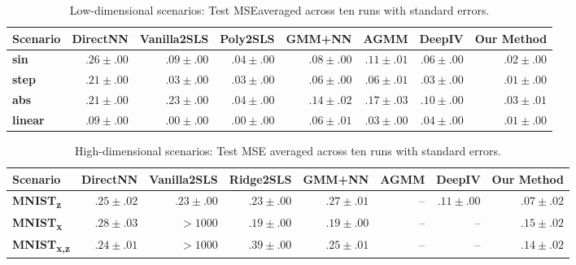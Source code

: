 \documentclass{article}
\theoremstyle{plain}
\theoremstyle{definition}
\newcommand\mnist[1]{\textbf{MNIST\textsubscript{#1}}}
\begin{document}
  {
\begin{table}[t!]
\setlength{\tabcolsep}{3pt}
\centering
\begin{tabular}{lrrrrrrr}
\toprule
  {Scenario} &       {DirectNN} &    {Vanilla2SLS} &       {Poly2SLS} &         {GMM+NN} &           {AGMM} &         {DeepIV} &     {Our Method} \\
\midrule
    \textbf{sin} &  $.26 \pm .00$ &  $.09 \pm .00$ &  $.04 \pm .00$ &  $.08 \pm .00$ &  $.11 \pm .01$ &  $.06 \pm .00$ &  $.02 \pm .00$ \\
  \textbf{step} &  $.21 \pm .00$ &  $.03 \pm .00$ &  $.03 \pm .00$ &  $.06 \pm .00$ &  $.06 \pm .01$ &  $.03 \pm .00$ &  $.01 \pm .00$ \\
   \textbf{abs} &  $.21 \pm .00$ &  $.23 \pm .00$ &  $.04 \pm .00$ &  $.14 \pm .02$ &  $.17 \pm .03$ &  $.10 \pm .00$ &  $.03 \pm .01$ \\
 \textbf{linear} &  $.09 \pm .00$ &  $.00 \pm .00$ &  $.00 \pm .00$ &  $.06 \pm .01$ &  $.03 \pm .00$ &  $.04 \pm .00$ &  $.01 \pm .00$ \\
\bottomrule
\end{tabular}
%
\caption{Low-dimensional scenarios: Test MSE\label{tab:lowdimex} averaged across ten runs with standard errors.}
%
\end{table}
%
%
%
%
\begin{table}[t!]
\setlength{\tabcolsep}{3pt}
\centering
\begin{tabular}{lrrrrrrr}
\toprule
       Scenario &         DirectNN &                                Vanilla2SLS &        Ridge2SLS &           GMM+NN & AGMM & DeepIV &       Our Method \\
\midrule
   \mnist{z} &  $.25 \pm .02$ &                            $.23 \pm .00$ &  $.23 \pm .00$ &  $.27 \pm .01$ &  -- &    $.11 \pm .00$  &  $.07 \pm .02$ \\
   \mnist{x} &  $.28 \pm .03$ &  $ > 1000 $ &  $.19 \pm .00$ &  $.19 \pm .00$ &  -- &    -- &  $.15 \pm .02$ \\
 \mnist{x,z} &  $.24 \pm .01$ &               $ > 1000$ &  $.39 \pm .00$ &  $.25 \pm .01$ &  -- &    -- &  $.14 \pm .02$ \\
\bottomrule
\end{tabular}
%
\caption{High-dimensional scenarios: Test MSE averaged across ten runs\label{tab:highdimex} with standard errors.}\label{tab:hidimex}\vspace{-2em}
\end{table}
}
  
\end{document}
